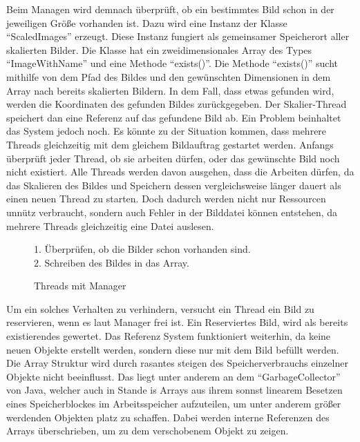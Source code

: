 Beim Managen wird demnach überprüft, ob ein bestimmtes Bild schon in der jeweiligen Größe vorhanden ist. Dazu wird eine Instanz der Klasse ``ScaledImages'' erzeugt. Diese Instanz fungiert als gemeinsamer Speicherort aller skalierten Bilder. Die Klasse hat ein zweidimensionales Array des Types ``ImageWithName'' und eine Methode ``exists()''. Die Methode ``exists()'' sucht mithilfe von dem Pfad des Bildes und den gewünschten Dimensionen in dem Array nach bereits skalierten Bildern. In dem Fall, dass etwas gefunden wird, werden die Koordinaten des gefunden Bildes zurückgegeben. Der Skalier-Thread speichert dan eine Referenz auf das gefundene Bild ab.
\medskip
\newline
Ein Problem beinhaltet das System jedoch noch. Es könnte zu der Situation kommen, dass mehrere Threads gleichzeitig mit dem gleichem Bildauftrag gestartet werden. Anfangs überprüft jeder Thread, ob sie arbeiten dürfen, oder das gewünschte Bild noch nicht existiert. Alle Threads werden davon ausgehen, dass die Arbeiten dürfen, da das Skalieren des Bildes und Speichern dessen vergleichsweise länger dauert als einen neuen Thread zu starten. Doch dadurch werden nicht nur Ressourcen unnütz verbraucht, sondern auch Fehler in der Bilddatei können entstehen, da mehrere Threads gleichzeitig eine Datei auslesen.

\begin{figure}[h]
    \centering
    \begin{minipage}{89mm}
        \fontsize{10pt}{11pt}\selectfont%
        \def\svgwidth{8cm}
        
    \end{minipage}
    \begin{minipage}{1\textwidth-91mm}
        1. Überprüfen, ob die Bilder schon vorhanden sind.\\
        2. Schreiben des Bildes in das Array.
    \end{minipage}
    \caption[Thread und Manager]{Threads mit Manager}
\end{figure}

Um ein solches Verhalten zu verhindern, versucht ein Thread ein Bild zu reservieren, wenn es laut Manager frei ist. Ein Reserviertes Bild, wird als bereits existierendes gewertet. Das Referenz System funktioniert weiterhin, da keine neuen Objekte erstellt werden, sondern diese nur mit dem Bild befüllt werden. Die Array Struktur wird durch rasantes steigen des Speicherverbrauchs einzelner Objekte nicht beeinflusst. Das liegt unter anderem an dem ``GarbageCollector'' von Java, welcher auch in Stande is Arrays aus ihrem sonnst linearem Besetzen eines Speicherblockes im Arbeitsspeicher aufzuteilen, um unter anderem größer werdenden Objekten platz zu schaffen. Dabei werden interne Referenzen des Arrays überschrieben, um zu dem verschobenem Objekt zu zeigen.

